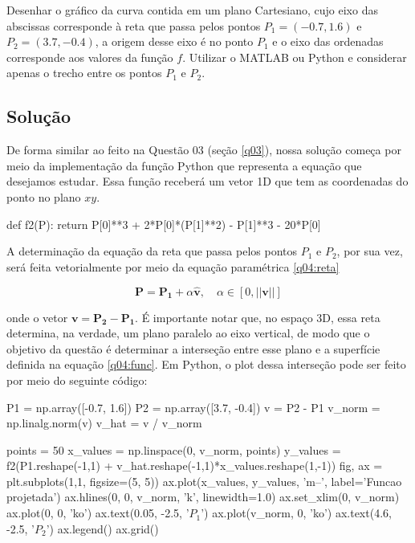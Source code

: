 \documentclass[10pt, a4paper]{article}
\begin{document}
Desenhar o gráfico da curva contida em um plano Cartesiano, 
cujo eixo das abscissas corresponde à reta que passa pelos pontos 
$P_1 = (-0.7, 1.6)$ e $P_2 = (3.7,-0.4)$, a origem desse eixo é no 
ponto $P_1$ e o eixo das ordenadas corresponde aos valores da função $f$. 
Utilizar o MATLAB ou Python e considerar apenas o trecho entre os pontos 
$P_1$ e $P_2$.

\subsection{Solução}

De forma similar ao feito na Questão 03 (seção \ref{q03}), nossa solução começa por meio da
implementação da função Python que representa a equação que desejamos estudar. Essa função receberá
um vetor 1D que tem as coordenadas do ponto no plano $xy$.

\begin{python}
def f2(P):
    return P[0]**3 + 2*P[0]*(P[1]**2) - P[1]**3 - 20*P[0]
\end{python}

A determinação da equação da reta que passa pelos pontos $P_1$ e $P_2$, por sua vez, será feita
vetorialmente por meio da equação paramétrica \cref{q04:reta}

\begin{equation}\label{q04:reta}
  \mathbf{P} = \mathbf{P_1} + \alpha\mathbf{\hat{v}}, \quad \alpha \in \left[0, ||\mathbf{v}||\right]
\end{equation}

onde o vetor $\mathbf{v} = \mathbf{P_2} - \mathbf{P_1}$. É importante notar que, 
no espaço 3D, essa reta determina, na verdade, um plano paralelo ao eixo vertical,
de modo que o objetivo da questão é determinar a interseção entre esse plano e a superfície
definida na equação \cref{q04:func}. Em Python, o plot dessa interseção pode ser feito por meio do seguinte código:

\begin{python}
P1 = np.array([-0.7, 1.6])
P2 = np.array([3.7, -0.4])
v = P2 - P1
v_norm = np.linalg.norm(v)
v_hat  = v / v_norm

points = 50
x_values = np.linspace(0, v_norm, points)
y_values = f2(P1.reshape(-1,1) + v_hat.reshape(-1,1)*x_values.reshape(1,-1))
fig, ax = plt.subplots(1,1, figsize=(5, 5))
ax.plot(x_values, y_values, 'm--', label='Funcao projetada')
ax.hlines(0, 0, v_norm, 'k', linewidth=1.0)
ax.set_xlim(0, v_norm)
ax.plot(0, 0, 'ko')
ax.text(0.05, -2.5, '$P_1$')
ax.plot(v_norm, 0, 'ko')
ax.text(4.6, -2.5, '$P_2$')
ax.legend()
ax.grid()
\end{python}
\end{document}

